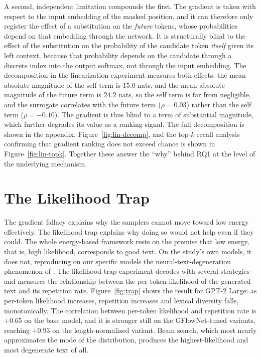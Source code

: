 A second, independent limitation compounds the first. The gradient is taken with respect to the input embedding of the masked position, and it can therefore only register the effect of a substitution on the \emph{future} tokens, whose probabilities depend on that embedding through the network. It is structurally blind to the effect of the substitution on the probability of the candidate token \emph{itself} given its left context, because that probability depends on the candidate through a discrete index into the output softmax, not through the input embedding. The decomposition in the linearization experiment measures both effects: the mean absolute magnitude of the self term is $15.0$ nats, and the mean absolute magnitude of the future term is $24.2$ nats, so the self term is far from negligible, and the surrogate correlates with the future term ($\rho = 0.03$) rather than the self term ($\rho = -0.10$).
The gradient is thus blind to a term of substantial magnitude, which further degrades its value as a ranking signal. The full decomposition is shown in the appendix, Figure~\ref{fig:lin-decomp}, and the top-$k$ recall analysis confirming that gradient ranking does not exceed chance is shown in Figure~\ref{fig:lin-topk}. Together these answer the ``why'' behind RQ1 at the level of the underlying mechanism.

\section{The Likelihood Trap}
\label{sec:results-trap}

The gradient fallacy explains why the samplers cannot move toward low energy effectively. The likelihood trap explains why doing so would not help even if they could. The whole energy-based framework rests on the premise that low energy, that is, high likelihood, corresponds to good text. On the study's own models, it does not, reproducing on our specific models the neural-text-degeneration phenomenon of \citet{holtzman2020curious}. The likelihood-trap experiment decodes with several strategies and measures the relationship between the per-token likelihood of the generated text and its repetition rate. Figure~\ref{fig:trap} shows the result for GPT-2 Large: as per-token likelihood increases, repetition increases and lexical diversity falls, monotonically. The correlation between per-token likelihood and repetition rate is $+0.65$ on the base model, and it is stronger still on the GFlowNet-tuned variants, reaching $+0.93$ on the length-normalized variant.
Beam search, which most nearly approximates the mode of the distribution, produces the highest-likelihood and most degenerate text of all.

